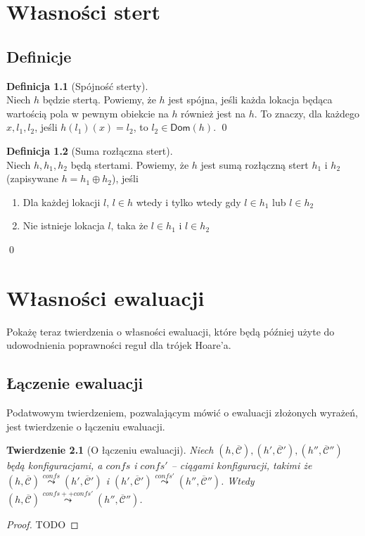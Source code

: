 \documentclass[]{pracamgr}
\renewcommand \| {\hspace{0.75em} | \hspace{0.75em} }
\renewcommand \[ {[\![}
\renewcommand \] {]\!]}
\newcommand \eval [1] {\overset{#1}{\leadsto}}
\newtheorem{theorem}{Twierdzenie}
\theoremstyle{definition}
\newtheorem{definition}{Definicja}[section]
\newcommand{\ctxt}{\mathcal{C}\xspace}
\newcommand{\ctxts}{\overline{\ctxt}}
\newcommand{\dom}[1]{\mathsf{Dom}(#1)\xspace}
\begin{document}
\chapter{Własności stert}

\section{Definicje}
\begin{definition}[Spójność sterty]{\ } \\
Niech $h$ będzie stertą.
Powiemy, że $h$ jest spójna, jeśli każda lokacja będąca wartością pola w pewnym obiekcie na $h$
również jest na $h$.
To znaczy, dla każdego $x, l_1, l_2$, jeśli $h(l_1)(x) = l_2$, to $l_2 \in \dom{h}$.
\qed
\end{definition}

\begin{definition}[Suma rozłączna stert]{\ } \\
Niech $h, h_1, h_2$ będą stertami.
Powiemy, że $h$ jest sumą rozłączną stert $h_1$ i $h_2$ (zapisywane $h = h_1 \oplus h_2$),
jeśli
\begin{enumerate}
 \item Dla każdej lokacji $l$, $l \in h$ wtedy i tylko wtedy gdy $l \in h_1$ lub $l \in h_2$
 \item Nie istnieje lokacja $l$, taka że $l \in h_1$ i $l \in h_2$
\end{enumerate}

\qed
\end{definition}


\chapter{Własności ewaluacji}
Pokażę teraz twierdzenia o własności ewaluacji, które będą później użyte do udowodnienia poprawności reguł dla trójek Hoare'a.
\section{Łączenie ewaluacji}
Podatwowym twierdzeniem, pozwalającym mówić o ewaluacji złożonych wyrażeń, jest twierdzenie o łączeniu ewaluacji.
\begin{theorem}[O łączeniu ewaluacji]
Niech $(h, \ctxts), (h', \ctxts'), (h'', \ctxts'')$ będą konfiguracjami, a $confs$ i $confs'$ -- ciągami konfiguracji,
takimi że $(h, \ctxts) \eval{confs} (h', \ctxts')$ i $(h', \ctxts') \eval{confs'} (h'', \ctxts'')$.
Wtedy $(h, \ctxts) \eval{confs ++ confs'} (h'', \ctxts'')$.
\end{theorem}
\begin{proof}
TODO
\end{proof}
\end{document}
